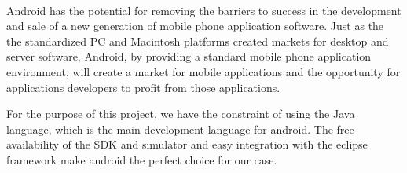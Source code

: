 \paragraph{}
Android has the potential for removing the barriers to success in the development and sale of a new generation of mobile phone application software. Just as the the standardized PC and Macintosh platforms created markets for desktop and server software, Android, by providing a standard mobile phone application environment, will create a market for mobile applications and the opportunity for applications developers to profit from those applications.

For the purpose of this project, we have the constraint of using the Java language, which is the main development language for android. The free availability of the SDK and simulator and easy integration with the eclipse framework make android the perfect choice for our case.
